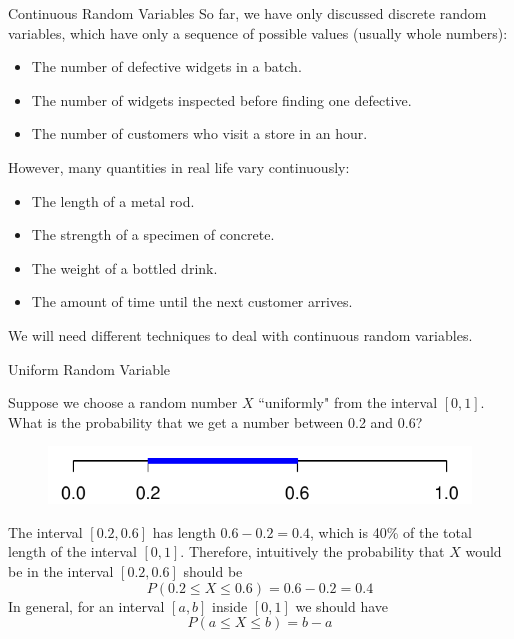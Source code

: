\documentclass{beamer}
\begin{document}
\begin{frame}{Continuous Random Variables}
So far, we have only discussed discrete random variables, which have only a sequence of possible values (usually whole numbers):
\begin{itemize}
\item The number of defective widgets in a batch.
\item The number of widgets inspected before finding one defective.
\item The number of customers who visit a store in an hour.
\end{itemize}
However, many quantities in real life vary continuously:
\begin{itemize}
\item The length of a metal rod.
\item The strength of a specimen of concrete.
\item The weight of a bottled drink.
\item The amount of time until the next customer arrives.
\end{itemize}
We will need different techniques to deal with continuous random variables.
\end{frame}

\begin{frame}{Uniform Random Variable}
\begin{block}{}
Suppose we choose a random number $X$ ``uniformly" from the interval $[0,1]$. 
What is the probability that we get a number between 0.2 and 0.6?
\end{block}
\pause \begin{figure}[H]
\includegraphics{ch4_interval.pdf}
\end{figure}
\pause The interval $[0.2, 0.6]$ has length $0.6-0.2=0.4$, which is 40\% of the total length of the interval $[0,1]$. Therefore, intuitively the probability that $X$ would be in the interval $[0.2, 0.6]$ should be
$$ P(0.2 \leq X \leq 0.6) = 0.6-0.2 = 0.4$$
In general, for an interval $[a,b]$ inside $[0,1]$ we should have
$$ P(a \leq X \leq b) = b- a$$
\end{frame}
\end{document}
